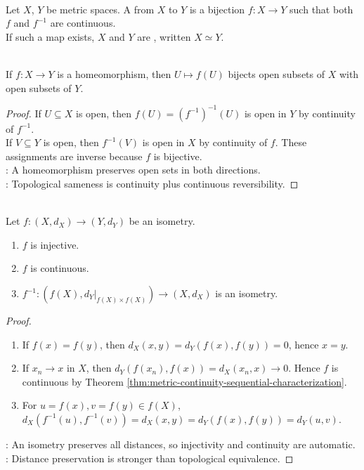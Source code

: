 \begin{definition} \label{def:homeomorphism} \\
Let $X$, $Y$ be metric spaces. A  from $X$ to $Y$ is a bijection $f:X\to Y$ such that both $f$ and $f^{-1}$ are continuous.\\
If such a map exists, $X$ and $Y$ are , written $X\simeq Y$.
\end{definition}

\begin{proposition} \label{prop:homeomorphisms-preserve-topology} \\
If $f:X\to Y$ is a homeomorphism, then $U\mapsto f(U)$ bijects open subsets of $X$ with open subsets of $Y$.
\begin{proof}
If $U\subseteq X$ is open, then $f(U)=(f^{-1})^{-1}(U)$ is open in $Y$ by continuity of $f^{-1}$.\\
If $V\subseteq Y$ is open, then $f^{-1}(V)$ is open in $X$ by continuity of $f$. These assignments are inverse because $f$ is bijective.\\
: A homeomorphism preserves open sets in both directions.\\
: Topological sameness is continuity plus continuous reversibility.
\end{proof}
\end{proposition}

\begin{theorem} \label{thm:metric-isometry-basic-properties} \\
Let $f:(X,d_X)\to(Y,d_Y)$ be an isometry.
\begin{enumerate}[label=(\roman*)]
\setlength{\itemsep}{0pt}
\item $f$ is injective.
\item $f$ is continuous.
\item $f^{-1}:(f(X),d_Y|_{f(X)\times f(X)})\to(X,d_X)$ is an isometry.
\end{enumerate}
\begin{proof}
\begin{enumerate}[label=(\roman*)]
\setlength{\itemsep}{0pt}
\item If $f(x)=f(y)$, then $d_X(x,y)=d_Y(f(x),f(y))=0$, hence $x=y$.
\item If $x_n\to x$ in $X$, then $d_Y(f(x_n),f(x))=d_X(x_n,x)\to0$. Hence $f$ is continuous by Theorem \ref{thm:metric-continuity-sequential-characterization}.
\item For $u=f(x),v=f(y)\in f(X)$, $d_X(f^{-1}(u),f^{-1}(v))=d_X(x,y)=d_Y(f(x),f(y))=d_Y(u,v)$.
\end{enumerate}
: An isometry preserves all distances, so injectivity and continuity are automatic.\\
: Distance preservation is stronger than topological equivalence.
\end{proof}
\end{theorem}

